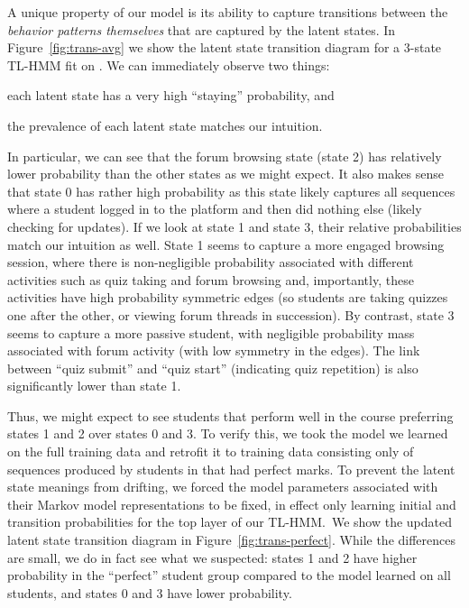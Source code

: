 A unique property of our model is its ability to capture transitions
between the \emph{behavior patterns themselves} that are captured by the
latent states. In Figure~\ref{fig:trans-avg} we show the latent state
transition diagram for a 3-state TL-HMM fit on \textretrieval{}. We can
immediately observe two things: \begin{enumerate*}[label=(\arabic*)]
  \item each latent state has a very high ``staying'' probability, and
  \item the prevalence of each latent state matches our intuition.
\end{enumerate*}
In particular, we can see that the forum browsing state (state 2) has
relatively lower probability than the other states as we might expect. It
also makes sense that state 0 has rather high probability as this state
likely captures all sequences where a student logged in to the platform and
then did nothing else (likely checking for updates). If we look at state 1
and state 3, their relative probabilities match our intuition as
well. State 1 seems to capture a more engaged browsing session, where there
is non-negligible probability associated with different activities such as
quiz taking and forum browsing and, importantly, these activities have high
probability symmetric edges (so students are taking quizzes one after the
other, or viewing forum threads in succession). By contrast, state 3 seems
to capture a more passive student, with negligible probability mass
associated with forum activity (with low symmetry in the edges). The link
between ``quiz submit'' and ``quiz start'' (indicating quiz repetition) is
also significantly lower than state 1.

Thus, we might expect to see students that perform well in the course
preferring states 1 and 2 over states 0 and 3. To verify this, we took the
model we learned on the full training data and retrofit it to training data
consisting only of sequences produced by students in \textretrieval{} that
had perfect marks. To prevent the latent state meanings from drifting, we
forced the model parameters associated with their Markov model
representations to be fixed, in effect only learning initial and transition
probabilities for the top layer of our TL-HMM.\ We show the updated latent
state transition diagram in Figure~\ref{fig:trans-perfect}. While the
differences are small, we do in fact see what we suspected: states 1 and 2
have higher probability in the ``perfect'' student group compared to the
model learned on all students, and states 0 and 3 have lower probability.
